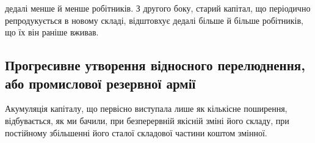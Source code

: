 \parcont{}  %
дедалі менше й менше робітників. З другого боку, старий капітал,
що періодично репродукується в новому складі, відштовхує
дедалі більше й більше робітників, що їх він раніше вживав.

\subsection[Проґресивне утворення відносного перелюднення,
або промислової резервної армії]{Прогресивне утворення відносного перелюднення,
або промислової резервної армії\footnotemarkZ{}}

Акумуляція капіталу, що первісно виступала лише як кількісне
поширення, відбувається, як ми бачили, при безперервній
якісній зміні його складу, при постійному збільшенні його сталої
складової частини коштом змінної.

